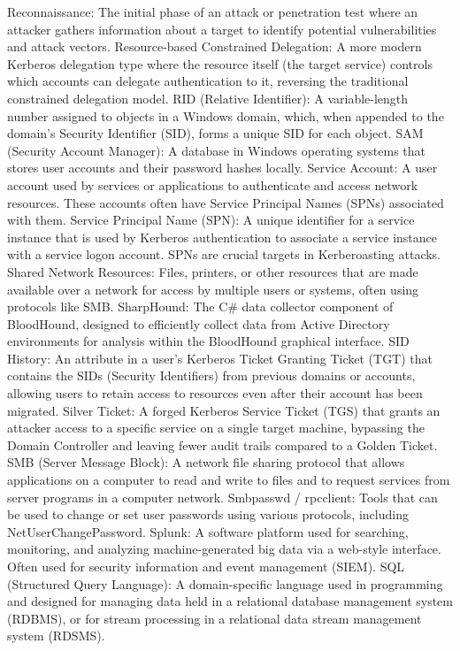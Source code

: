 Reconnaissance: The initial phase of an attack or penetration test where an attacker gathers information about a target to identify potential vulnerabilities and attack vectors.
Resource-based Constrained Delegation: A more modern Kerberos delegation type where the resource itself (the target service) controls which accounts can delegate authentication to it, reversing the traditional constrained delegation model.
RID (Relative Identifier): A variable-length number assigned to objects in a Windows domain, which, when appended to the domain's Security Identifier (SID), forms a unique SID for each object.
SAM (Security Account Manager): A database in Windows operating systems that stores user accounts and their password hashes locally.
Service Account: A user account used by services or applications to authenticate and access network resources. These accounts often have Service Principal Names (SPNs) associated with them.
Service Principal Name (SPN): A unique identifier for a service instance that is used by Kerberos authentication to associate a service instance with a service logon account. SPNs are crucial targets in Kerberoasting attacks.
Shared Network Resources: Files, printers, or other resources that are made available over a network for access by multiple users or systems, often using protocols like SMB.
SharpHound: The C# data collector component of BloodHound, designed to efficiently collect data from Active Directory environments for analysis within the BloodHound graphical interface.
SID History: An attribute in a user's Kerberos Ticket Granting Ticket (TGT) that contains the SIDs (Security Identifiers) from previous domains or accounts, allowing users to retain access to resources even after their account has been migrated.
Silver Ticket: A forged Kerberos Service Ticket (TGS) that grants an attacker access to a specific service on a single target machine, bypassing the Domain Controller and leaving fewer audit trails compared to a Golden Ticket.
SMB (Server Message Block): A network file sharing protocol that allows applications on a computer to read and write to files and to request services from server programs in a computer network.
Smbpasswd / rpcclient: Tools that can be used to change or set user passwords using various protocols, including NetUserChangePassword.
Splunk: A software platform used for searching, monitoring, and analyzing machine-generated big data via a web-style interface. Often used for security information and event management (SIEM).
SQL (Structured Query Language): A domain-specific language used in programming and designed for managing data held in a relational database management system (RDBMS), or for stream processing in a relational data stream management system (RDSMS).
